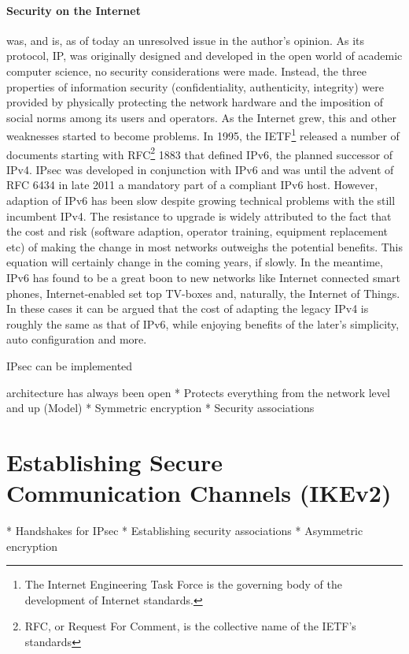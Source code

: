\documentclass[final,letterpaper,twoside,12pt,twocolumn]{report}
\begin{document}
\paragraph{Security on the Internet} was, and is, as of today an unresolved issue in the author's opinion. As its protocol, IP, was originally designed and developed in the open world of academic computer science, no security considerations were made. Instead, the three properties of information security (confidentiality, authenticity, integrity) \citep[section 8.1]{vasseur10interconnecting} were provided by physically protecting the network hardware and the imposition of social norms among its users and operators. As the Internet grew, this and other weaknesses started to become problems. In 1995, the IETF\footnote{The Internet Engineering Task Force is the governing body of the development of Internet standards.} released a number of documents starting with RFC\footnote{RFC, or Request For Comment, is the collective name of the IETF's standards} 1883\cite{rfc1883} that defined IPv6, the planned successor of IPv4. IPsec was developed in conjunction with IPv6 and was until the advent of RFC 6434\cite{rfc6434} in late 2011 a mandatory part of a compliant IPv6 host. However, adaption of IPv6 has been slow despite growing technical problems with the still incumbent IPv4. The resistance to upgrade is widely attributed to the fact that the cost and risk (software adaption, operator training, equipment replacement etc) of making the change in most networks outweighs the potential benefits. This equation will certainly change in the coming years, if slowly. In the meantime, IPv6 has found to be a great boon to new networks like Internet connected smart phones, Internet-enabled set top TV-boxes and, naturally, the Internet of Things. In these cases it can be argued that the cost of adapting the legacy IPv4 is roughly the same as that of IPv6, while enjoying benefits of the later's simplicity, auto configuration and more.

IPsec can be implemented 

 architecture has always been open
* Protects everything from the network level and up (Model)
* Symmetric encryption
* Security associations

\section{Establishing Secure Communication Channels (IKEv2)}
* Handshakes for IPsec
* Establishing security associations
* Asymmetric encryption
\end{document}
